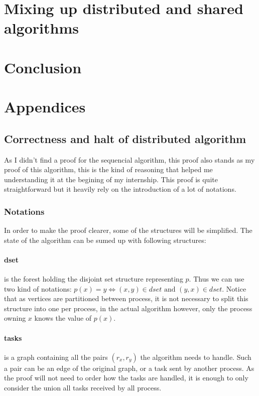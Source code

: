 \documentclass[12px]{article}
\begin{document}
  \section{Mixing up distributed and shared algorithms}


  \section{Conclusion}


  \section{Appendices}

    \subsection{Correctness and halt of distributed algorithm}
      As I didn't find a proof for the sequencial algorithm, this proof also stands as my proof of this algorithm, this is the kind of reasoning that helped me understanding it at the begining of my internship.
      This proof is quite straightforward but it heavily rely on the introduction of a lot of notations.


      \subsubsection{Notations}
        In order to make the proof clearer, some of the structures will be simplified. The state of the algorithm can be sumed up with following structures:

        \paragraph{dset} is the forest holding the disjoint set structure representing $p$. Thus we can use two kind of notations: $p(x) = y \Leftrightarrow (x, y) \in dset \text{ and } (y, x) \in dset$. Notice that as vertices are partitioned between process, it is not necessary to split this structure into one per process, in the actual algorithm however, only the process owning $x$ knows the value of $p(x)$.

        \paragraph{tasks} is a graph containing all the pairs $(r_x, r_y)$ the algorithm needs to handle. Such a pair can be an edge of the original graph, or a task sent by another process. As the proof will not need to order how the tasks are handled, it is enough to only consider the union all tasks received by all process.
\end{document}
